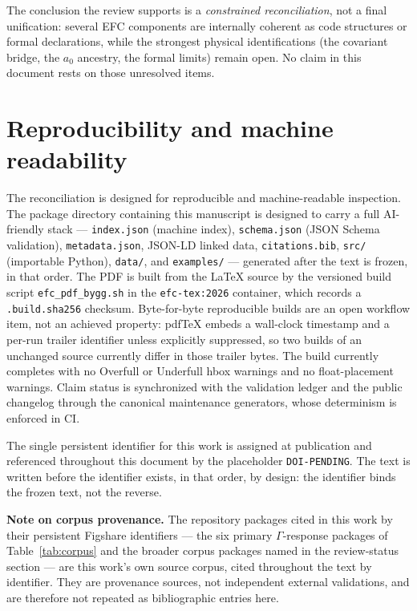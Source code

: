 \documentclass[11pt,a4paper]{article}
\newcommand{\paperdoi}{DOI-PENDING}
\begin{document}
The conclusion the review supports is a \emph{constrained reconciliation}, not
a final unification: several EFC components are internally coherent as code
structures or formal declarations, while the strongest physical identifications
(the covariant bridge, the $a_0$ ancestry, the formal limits) remain open. No
claim in this document rests on those unresolved items.

\section{Reproducibility and machine readability}

The reconciliation is designed for reproducible and machine-readable inspection. The package directory containing this manuscript is designed to carry a full AI-friendly stack --- \texttt{index.json} (machine index), \texttt{schema.json} (JSON Schema validation), \texttt{metadata.json}, JSON-LD linked data, \texttt{citations.bib}, \texttt{src/} (importable Python), \texttt{data/}, and \texttt{examples/} --- generated after the text is frozen, in that order. The PDF is built from the \LaTeX{} source by the versioned build script \texttt{efc\_pdf\_bygg.sh} in the \texttt{efc-tex:2026} container, which records a \texttt{.build.sha256} checksum. Byte-for-byte reproducible builds are an open workflow item, not an achieved property: pdfTeX embeds a wall-clock timestamp and a per-run trailer identifier unless explicitly suppressed, so two builds of an unchanged source currently differ in those trailer bytes. The build currently completes with no Overfull or Underfull hbox warnings and no float-placement warnings. Claim status is synchronized with the validation ledger and the public changelog through the canonical maintenance generators, whose determinism is enforced in CI.

The single persistent identifier for this work is assigned at publication and referenced throughout this document by the placeholder \texttt{\paperdoi}. The text is written before the identifier exists, in that order, by design: the identifier binds the frozen text, not the reverse.

\clearpage
\noindent\textbf{Note on corpus provenance.} The repository packages cited in this work by their persistent Figshare identifiers --- the six primary $\Gamma$-response packages of Table~\ref{tab:corpus} and the broader corpus packages named in the review-status section --- are this work's own source corpus, cited throughout the text by identifier. They are provenance sources, not independent external validations, and are therefore not repeated as bibliographic entries here.
\end{document}
